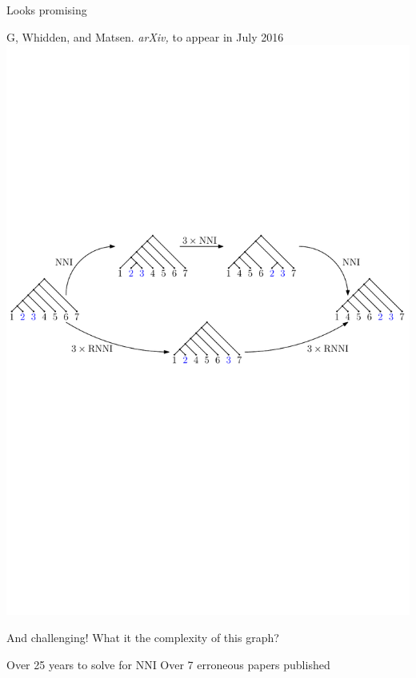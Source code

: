 \documentclass{beamer}
\theoremstyle{example}
\begin{document}
\begin{frame}{Looks promising}
\begin{block}{G, Whidden, and Matsen. \emph{arXiv,} to appear in July 2016}
\includegraphics[width = \framewidth]{NNI_VS_rNNI.pdf}
\end{block}

\pause

\begin{block}{And challenging!}
What it the complexity of this graph?
\end{block}

\begin{outline}
\1 Over 25 years to solve for NNI
\1 Over 7 erroneous papers published
\end{outline}

\end{frame}
\end{document}
